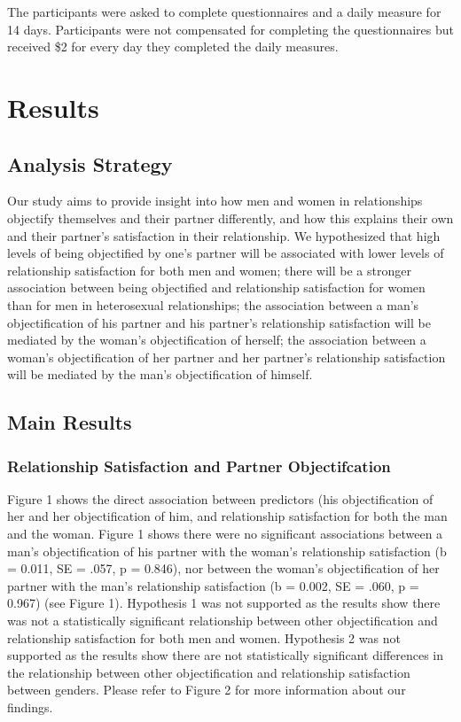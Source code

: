\documentclass[
  man]{apa6}
\begin{document}
The participants were asked to complete questionnaires and a daily measure for 14 days. Participants were not compensated for completing the questionnaires but received \$2 for every day they completed the daily measures.

\hypertarget{results}{%
\section{Results}\label{results}}

\hypertarget{analysis-strategy}{%
\subsection{Analysis Strategy}\label{analysis-strategy}}

Our study aims to provide insight into how men and women in relationships objectify themselves and their partner differently, and how this explains their own and their partner's satisfaction in their relationship. We hypothesized that high levels of being objectified by one's partner will be associated with lower levels of relationship satisfaction for both men and women; there will be a stronger association between being objectified and relationship satisfaction for women than for men in heterosexual relationships; the association between a man's objectification of his partner and his partner's relationship satisfaction will be mediated by the woman's objectification of herself; the association between a woman's objectification of her partner and her partner's relationship satisfaction will be mediated by the man's objectification of himself.

\hypertarget{main-results}{%
\subsection{Main Results}\label{main-results}}

\hypertarget{relationship-satisfaction-and-partner-objectifcation}{%
\subsubsection{Relationship Satisfaction and Partner Objectifcation}\label{relationship-satisfaction-and-partner-objectifcation}}

Figure 1 shows the direct association between predictors (his objectification of her and her objectification of him, and relationship satisfaction for both the man and the woman. Figure 1 shows there were no significant associations between a man's objectification of his partner with the woman's relationship satisfaction (b = 0.011, SE = .057, p = 0.846), nor between the woman's objectification of her partner with the man's relationship satisfaction (b = 0.002, SE = .060, p = 0.967) (see Figure 1). Hypothesis 1 was not supported as the results show there was not a statistically significant relationship between other objectification and relationship satisfaction for both men and women. Hypothesis 2 was not supported as the results show there are not statistically significant differences in the relationship between other objectification and relationship satisfaction between genders. Please refer to Figure 2 for more information about our findings.
\end{document}
